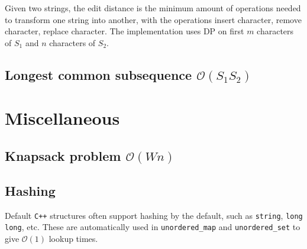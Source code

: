Given two strings, the edit distance is the minimum amount of operations needed to transform one string into another, with the operations insert character, remove character, replace character. The implementation uses DP on first $m$ characters of $S_1$ and $n$ characters of $S_2$.







\subsection{Longest common subsequence $\mathcal O(S_1S_2)$}






\section{Miscellaneous}

\subsection{Knapsack problem $\mathcal O(Wn)$}




\subsection{Hashing}

Default \texttt{C++} structures often support hashing by the default, such as \texttt{string}, \texttt{long long}, etc. These are automatically used in \texttt{unordered\_map} and \texttt{unordered\_set} to give $\mathcal O(1)$ lookup times.

